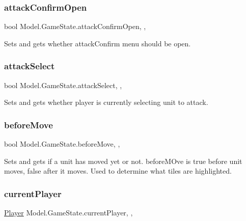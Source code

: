 \subsubsection{\texorpdfstring{attack\+Confirm\+Open}{attackConfirmOpen}}
{\footnotesize\ttfamily bool Model.\+Game\+State.\+attack\+Confirm\+Open\hspace{0.3cm}{\ttfamily [static]}, {\ttfamily [get]}, {\ttfamily [set]}}

Sets and gets whether attack\+Confirm menu should be open. \hypertarget{class_model_1_1_game_state_a6bad6fb7894df05450a002190dd37f89}{}\label{class_model_1_1_game_state_a6bad6fb7894df05450a002190dd37f89} 
\subsubsection{\texorpdfstring{attack\+Select}{attackSelect}}
{\footnotesize\ttfamily bool Model.\+Game\+State.\+attack\+Select\hspace{0.3cm}{\ttfamily [static]}, {\ttfamily [get]}, {\ttfamily [set]}}

Sets and gets whether player is currently selecting unit to attack. \hypertarget{class_model_1_1_game_state_af546cfa01e29773b5260cd6bfe8132b7}{}\label{class_model_1_1_game_state_af546cfa01e29773b5260cd6bfe8132b7} 
\subsubsection{\texorpdfstring{before\+Move}{beforeMove}}
{\footnotesize\ttfamily bool Model.\+Game\+State.\+before\+Move\hspace{0.3cm}{\ttfamily [static]}, {\ttfamily [get]}, {\ttfamily [set]}}

Sets and gets if a unit has moved yet or not. before\+M\+Ove is true before unit moves, false after it moves. Used to determine what tiles are highlighted. \hypertarget{class_model_1_1_game_state_aa541a7b45ea55484db8a3357d8e680de}{}\label{class_model_1_1_game_state_aa541a7b45ea55484db8a3357d8e680de} 
\subsubsection{\texorpdfstring{current\+Player}{currentPlayer}}
{\footnotesize\ttfamily \hyperlink{class_model_1_1_player}{Player} Model.\+Game\+State.\+current\+Player\hspace{0.3cm}{\ttfamily [static]}, {\ttfamily [get]}, {\ttfamily [set]}}

